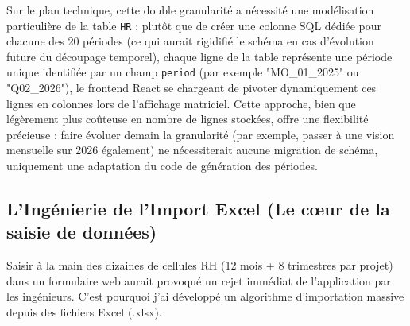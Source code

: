 Sur le plan technique, cette double granularité a nécessité une modélisation particulière de la table \texttt{HR} : plutôt que de créer une colonne SQL dédiée pour chacune des 20 périodes (ce qui aurait rigidifié le schéma en cas d'évolution future du découpage temporel), chaque ligne de la table représente une période unique identifiée par un champ \texttt{period} (par exemple "MO\_01\_2025" ou "Q02\_2026"), le frontend React se chargeant de pivoter dynamiquement ces lignes en colonnes lors de l'affichage matriciel. Cette approche, bien que légèrement plus coûteuse en nombre de lignes stockées, offre une flexibilité précieuse : faire évoluer demain la granularité (par exemple, passer à une vision mensuelle sur 2026 également) ne nécessiterait aucune migration de schéma, uniquement une adaptation du code de génération des périodes.

\subsection{L'Ingénierie de l'Import Excel (Le cœur de la saisie de données)}
Saisir à la main des dizaines de cellules RH (12 mois + 8 trimestres par projet) dans un formulaire web aurait provoqué un rejet immédiat de l'application par les ingénieurs. C'est pourquoi j'ai développé un algorithme d'importation massive depuis des fichiers Excel (.xlsx).

